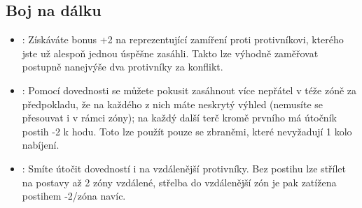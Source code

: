 \documentclass[../main.tex]{subfiles}
\begin{document}
\subsection{Boj na dálku}
\label{sec:trik-bnd}
\begin{itemize}
\item{}:
\label{sec:bnd-jeden_terc}
Získáváte bonus +2 na  reprezentující zamíření proti protivníkovi, kterého jste už alespoň jednou úspěšne zasáhli. Takto lze výhodně zaměřovat postupně nanejvýše dva protivníky za konflikt.

\item{}:
\label{sec:bnd-mnohonasobny}
Pomocí dovednosti  se můžete pokusit zasáhnout více nepřátel v téže zóně za předpokladu, že na každého z nich máte neskrytý výhled (nemusíte se přesouvat i v rámci zóny); na každý další terč kromě prvního má útočník postih -2 k hodu. Toto lze použít pouze se zbraněmi, které nevyžadují 1 kolo nabíjení.

\item {}:
\label{sec:bnd-odstrelovac}
Smíte útočit dovedností  i na vzdálenější protivníky. Bez postihu lze střílet na postavy až 2 zóny vzdálené, střelba do vzdálenější zón je pak zatížena postihem -2/zóna navíc. 

\end{itemize}
  
\end{document}
